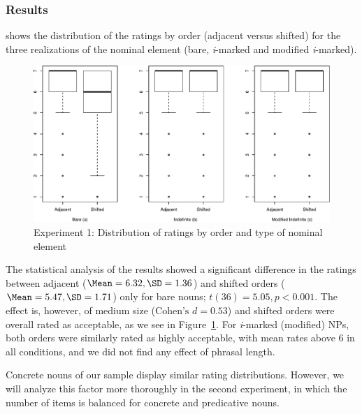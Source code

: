 \documentclass[output=paper]{langsci/langscibook}
\begin{document}
\subsubsection{Results}
 shows the distribution of the ratings by order (adjacent versus shifted) for the three realizations of the nominal element (bare, \textit{i}-marked and modified \textit{i}-marked). 

\begin{figure}[h]
    \includegraphics[width=1\linewidth]{plots/Rplot.pdf}
	\caption{Experiment 1: Distribution of ratings by order and type of nominal element}\label{boxplot}
\end{figure}

The statistical analysis of the results showed a significant difference in the ratings between adjacent ($\Mean=6.32, \SD=1.36$) and shifted orders ($\Mean=5.47, \SD=1.71$) only for bare nouns; $t(36)=5.05, p<0.001$.
The effect is, however, of medium size ($\text{Cohen's } d=0.53$) and shifted orders were overall rated as acceptable, as we see in Figure~\ref{boxplot}. 
For \textit{i}-marked (modified) NPs, both orders were similarly rated as highly acceptable, with mean rates above 6 %
in all conditions, and we did not find any effect of phrasal length.

Concrete nouns of our sample display similar rating distributions. However, we will analyze this factor more thoroughly in the second experiment, in which the number of items is balanced for concrete and predicative nouns.
\end{document}
